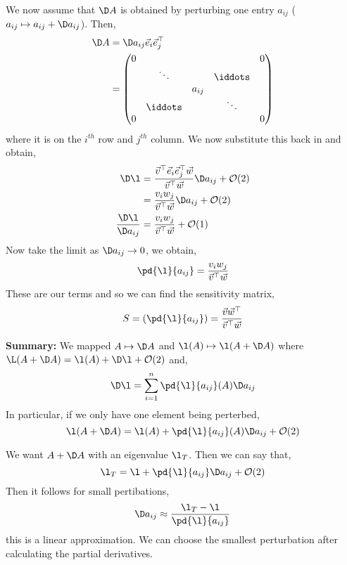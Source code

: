 We now assume that $\D A$ is obtained by perturbing one entry $a_{ij}$ ($a_{ij} \mapsto a_{ij} + \D a_{ij}$). Then, \begin{align*}
  \D A &= \D a_{ij} \vec e_i \vec e_j^\top \\
  &= \begin{pmatrix}
    0 &&&& 0 \\
    & \ddots &&\iddots& \\
    &&a_{ij}&&\\
    & \iddots &&\ddots&\\
    0 &&&& 0
\end{pmatrix}
\end{align*}
where it is on the $i^{th}$ row and $j^{th}$ column. We now substitute this back in and obtain,
\begin{align*}
  \D \l &= \frac{\vec v^\top \vec e_i \vec e_j^\top \vec w}{\vec v^\top \vec w}\D a_{ij} + \mathcal{O}(2) \\
  &= \frac{v_i w_j}{\vec v^\top\vec w}\D a_{ij} + \mathcal{O}(2) \\
  \frac{\D \l}{\D a_{ij}} &= \frac{v_i w_j}{\vec v^\top\vec w} + \mathcal{O}(1)
\end{align*}
Now take the limit as $\D a_{ij} \to 0$, we obtain,
$$ \pd{\l}{a_{ij}} = \frac{v_i w_j}{\vec v^\top \vec w} $$
These are our terms and so we can find the sensitivity matrix,
$$ S = \left( \pd{\l}{a_{ij}} \right) = \frac{\vec v \vec w^\top}{\vec v^\top \vec w} $$

\textbf{Summary:} We mapped $A \mapsto \D A$ and $\l(A) \mapsto \l(A + \D A)$ where $\L(A + \D A) = \l(A) + \D\l + \mathcal{O}(2)$ and,
$$ \D \l = \sum_{i=1}^n \pd{\l}{a_{ij}}(A)\D a_{ij} $$
In particular, if we only have one element being perterbed,
$$ \l(A + \D A) = \l(A) + \pd{\l}{a_{ij}}(A)\D a_{ij} + \mathcal{O}(2) $$

\noindent
We want $A + \D A$ with an eigenvalue $\l_T$. Then we can say that,
$$ \l_T = \l + \pd{\l}{a_{ij}}\D a_{ij} + \mathcal{O}(2) $$
Then it follows for small pertibations,
$$ \D a_{ij} \approx \frac{\l_T - \l}{\pd{\l}{a_{ij}}} $$
this is a linear approximation. We can choose the smallest perturbation after calculating the partial derivatives.

